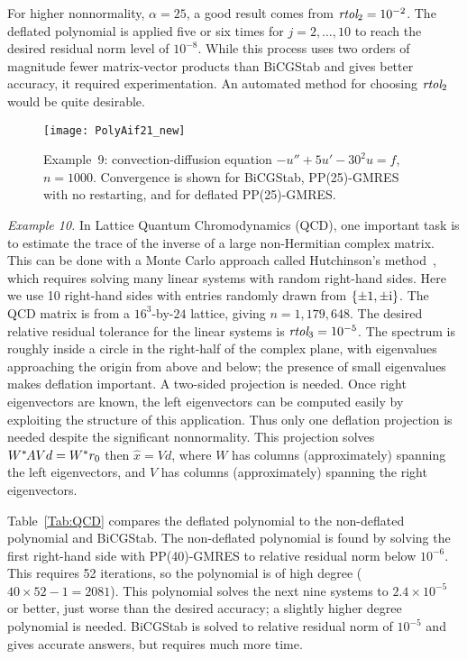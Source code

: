 \documentclass{siamart}
\def\rtol{\mbox{{\it rtol}}}
\begin{document}
For higher nonnormality, $\alpha = 25$, a good result comes from  $\rtol_2 = 10^{-2}$.  The deflated polynomial is applied five or six times for $j=2,\ldots, 10$ to reach the desired residual norm level of $10^{-8}$.  While this process uses two orders of magnitude fewer matrix-vector products than BiCGStab and gives better accuracy, it required experimentation.  An automated method for choosing $\rtol_2$  would be quite desirable.


\begin{figure}[t!]
\begin{center}
\texttt{[image: PolyAif21\_new]}
\end{center}
\vspace{-7pt}
\caption{Example~9: convection-diffusion equation $- u{''} + 5 u'- 30^2 u = f $, $n=1000$.  Convergence is shown for BiCGStab, PP(25)-GMRES with no restarting, and for deflated PP(25)-GMRES.}
\label{Fig:pAif21}
\end{figure}


{\it Example 10.} In Lattice Quantum Chromodynamics (QCD), one important task is to estimate the trace of the inverse of a large non-Hermitian complex matrix.  This can be done with a Monte Carlo approach called Hutchinson's method~\cite{HutchTrace}, which requires solving many linear systems with random right-hand sides.  Here we use 10  right-hand sides with entries randomly drawn from $\{\pm1, \pm{\rm i}\}$.   The QCD matrix is from a $16^3$-by-$24$ lattice, giving $n = 1{,}179{,}648$.  The desired relative residual tolerance for the linear systems is $\rtol_3 = 10^{-5}$.  
The spectrum is roughly inside a circle in the right-half of the complex plane, with eigenvalues approaching the origin from above and below; the presence of small eigenvalues makes deflation important.  A two-sided projection is needed.  Once right eigenvectors are known, the left eigenvectors can be computed easily by exploiting the structure of this application.  Thus only one deflation projection is needed despite the significant nonnormality.  This projection solves $W^*\kern-1pt AV d = W^*r_0$ then $\widehat{x} = V d$, where $W$ has columns (approximately) spanning the left eigenvectors, and $V$ has columns (approximately) spanning the right eigenvectors.  

Table~\ref{Tab:QCD} compares the deflated polynomial to the non-deflated polynomial and BiCGStab.   The non-deflated polynomial is found by solving the first right-hand side with PP(40)-GMRES to relative residual norm below $10^{-6}$.  This requires 52 iterations, so the polynomial is of high degree ($40\times 52-1 = 2081$).   This polynomial solves the next nine systems to $2.4\times 10^{-5}$ or better, just worse than the desired accuracy; a slightly higher degree polynomial is needed.  BiCGStab is solved to relative residual norm of $10^{-5}$ and gives accurate answers, but requires much more time.  
\end{document}
